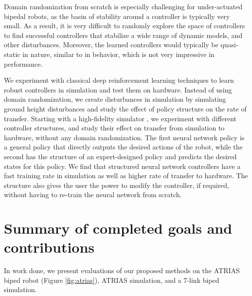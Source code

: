  Domain randomization from scratch is especially challenging for under-actuated bipedal robots, as the basin of stability around a controller is typically very small. As a result, it is very difficult to randomly explore the space of controllers to find successful controllers that stabilize a wide range of dynamic models, and other disturbances. Moreover, the learned controllers would typically be quasi-static in nature, similar to \cite{mordatch2015ensemble} in behavior, which is not very impressive in performance. 
 
We experiment with classical deep reinforcement learning techniques to learn robust controllers in simulation and test them on hardware. Instead of using domain randomization, we create disturbances in simulation by simulating ground height disturbances and study the effect of policy structure on the rate of transfer. Starting with a high-fidelity simulator \citep{martin2015robust}, we experiment with different controller structures, and study their effect on transfer from simulation to hardware, without any domain randomization. The first neural network policy is a general policy that directly outputs the desired actions of the robot, while the second has the structure of an expert-designed policy and predicts the desired states for this policy. We find that structured neural network controllers have a fast training rate in simulation as well as higher rate of transfer to hardware. The structure also gives the user the power to modify the controller, if required, without having to re-train the neural network from scratch.


\section{Summary of completed goals and contributions}

In work done, we present evaluations of our proposed methods on the ATRIAS biped robot (Figure \ref{fig:atrias}), ATRIAS simulation, and a 7-link biped simulation. 


